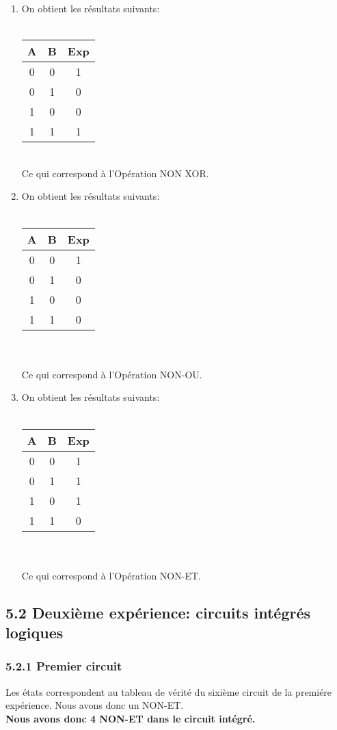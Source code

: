 \documentclass{report}
\begin{document}
\begin{enumerate}
\item On obtient les résultats suivants:\\
\\
\begin{tabular}{|c|c|c|}
\hline
A & B & Exp \\
\hline
0&0&1\\
0&1&0\\
1&0&0\\
1&1&1\\
\hline
\end{tabular}\\
\hspace*{1,2cm} Ce qui correspond \`a l'Op\'eration NON XOR.
\item On obtient les résultats suivants:\\
\\
\begin{tabular}{|c|c|c|}
\hline
A & B & Exp \\
\hline
0&0&1\\
0&1&0\\
1&0&0\\
1&1&0\\
\hline
\end{tabular}\\
\\
\hspace*{1,2cm} Ce qui correspond \`a l'Op\'eration NON-OU.
\newpage
\item On obtient les résultats suivants:\\
\\
\begin{tabular}{|c|c|c|}
\hline
A & B & Exp \\
\hline
0&0&1\\
0&1&1\\
1&0&1\\
1&1&0\\
\hline
\end{tabular}\\
\\
\hspace*{1,2cm} Ce qui correspond \`a l'Op\'eration NON-ET.
\end{enumerate}
\subsection*{5.2 Deuxi\`eme exp\'erience: circuits int\'egr\'es logiques}
\subsubsection*{5.2.1 Premier circuit}
\hspace*{1,5cm} Les \'etats correspondent au tableau de v\'erit\'e du sixi\`eme circuit de la premi\'ere exp\'erience. Nous avons donc un NON-ET.\\
\hspace*{2,0cm} \textbf{Nous avons donc 4 NON-ET dans le circuit int\'egr\'e.}
\end{document}
